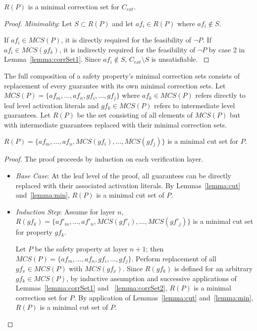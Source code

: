 \begin{lemma} $R(P)$ is a minimal correction set for $C_{ext}$.
\begin{proof}
\textit{Minimality}: Let $S \subset R(P)$ and let $af_i \in R(P)$ where $af_i \not \in S$. 

If $af_i \in MCS(P)$, it is directly required for the feasibility of $\neg P$. If $af_i \in MCS(gf_k)$, it is indirectly required for the feasibility of $\neg P$ by case 2 in Lemma~\ref{lemma:corrSet1}. Since $af_i \not \in S$, $C_{ext} \setminus S$ is unsatisfiable. 
\label{lemma:corrSet2}
\end{proof}
\end{lemma}

The full composition of a safety property's minimal correction sets consists of replacement of every guarantee with its own minimal correction sets. Let $MCS(P) = \{af_m, \dots, af_n, gf_i, \dots, gf_j\}$ where $af_k \in MCS(P)$ refers directly to leaf level activation literals and $gf_k \in MCS(P)$ refers to intermediate level guarantees. Let $R(P)$ be the set consisting of all elements of $MCS(P)$ but with intermediate guarantees replaced with their minimal correction sets. 

\begin{theorem} $R(P) = \{af_m, \dots, af_n, MCS(gf_i), \dots, MCS(gf_j)\}$ is a minimal cut set for $P$.
\begin{proof}
The proof proceeds by induction on each verification layer.
\begin{itemize}[label=$\lozenge$, itemsep=2ex]
\item {\em Base Case}: At the leaf level of the proof, all guarantees can be directly replaced with their associated activation literals. By Lemmas~\ref{lemma:cut} and~\ref{lemma:min}, $R(P)$ is a minimal cut set of $P$. 

\item {\em Induction Step}: Assume for layer $n$, $R(gf_k) = \{af'_m, \dots, af'_n, MCS(gf'_i), \dots, MCS(gf'_j)\}$ is a minimal cut set for property $gf_k$. 

Let $P$ be the safety property at layer $n+1$; then $MCS(P) = \{af_m, \dots, af_n, gf_i, \dots, gf_j\}$. Perform replacement of all $gf_x \in MCS(P)$ with $MCS(gf_x)$. Since $R(gf_k)$ is defined for an arbitrary $gf_k \in MCS(P)$, by inductive assumption and successive applications of Lemmas~\ref{lemma:corrSet1} and ~\ref{lemma:corrSet2}, $R(P)$ is a minimal correction set for $P$. By application of Lemmas~\ref{lemma:cut} and~\ref{lemma:min}, $R(P)$ is a minimal cut set of $P$. 


\end{itemize}

\end{proof}
\end{theorem}






